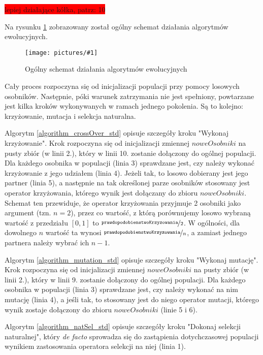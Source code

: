 \documentclass[twoside]{iisthesis}
\newcommand{\defacto}{\emph{de facto }}
\newcommand{\todo}{\colorbox{red}}
\newcommand{\param}{\mathtt}
\newcommand{\circled}[1]{\textcircled{\small{#1}}}
\newcommand{\img}[1]{\texttt{[image: pictures/\#1]}}
\begin{document}
\todo{lepiej działające kółka, patrz: \circled{10}}

\newpage

Na rysunku \ref{figure_ea_general} zobrazowany został ogólny schemat działania algorytmów ewolucyjnych. 

\begin{figure}
	\caption{Ogólny schemat działania algorytmów ewolucyjnych \label{figure_ea_general}}
	\img{ea_general.png}
\end{figure}

Cały proces rozpoczyna się od inicjalizacji populacji przy pomocy losowych osobników. Następnie, póki warunek zatrzymania nie jest spełniony, powtarzane jest kilka kroków wykonywanych w ramach jednego pokolenia. Są to kolejno: krzyżowanie, mutacja i selekcja naturalna.

Algorytm \ref{algorithm_crossOver_std} opisuje szczegóły kroku "Wykonaj krzyżowanie". Krok rozpoczyna się od inicjalizacji zmiennej $noweOsobniki$ na pusty zbiór (w linii 2.), który w linii 10. zostanie dołączony do ogólnej populacji. Dla każdego osobnika w populacji (linia 3) sprawdzane jest, czy należy wykonać krzyżowanie z jego udziałem (linia 4). Jeżeli tak, to losowo dobierany jest jego partner (linia 5), a następnie na tak określonej parze osobników stosowany jest operator krzyżowania, którego wynik jest dołączany do zbioru $noweOsobniki$. Schemat ten przewiduje, że operator krzyżowania przyjmuje 2 osobniki jako argument (tzn. $n = 2$), przez co wartość, z którą porównujemy losowo wybraną wartość z przedziału $[0, 1]$ to $\nicefrac{\param{prawdopodobienstwoKrzyzowania}}{2}$. W ogólności, dla dowolnego $n$ wartość ta wynosi $\nicefrac{\param{prawdopodobienstwoKrzyzowania}}{n}$, a zamiast jednego partnera należy wybrać ich $n-1$.

Algorytm \ref{algorithm_mutation_std} opisuje szczegóły kroku "Wykonaj mutację". Krok rozpoczyna się od inicjalizacji zmiennej $noweOsobniki$ na pusty zbiór (w linii 2.), który w linii 9. zostanie dołączony do ogólnej populacji. Dla każdego osobnika w populacji (linia 3) sprawdzane jest, czy należy wykonać na nim mutację (linia 4), a jeśli tak, to stosowany jest do niego operator mutacji, którego wynik zostaje dołączony do zbioru $noweOsobniki$ (linie 5 i 6).

Algorytm \ref{algorithm_natSel_std} opisuje szczegóły kroku "Dokonaj selekcji naturalnej", który \defacto sprowadza się do zastąpienia dotychczasowej populacji wynikiem zastosowania operatora selekcji na niej (linia 1).
\end{document}
